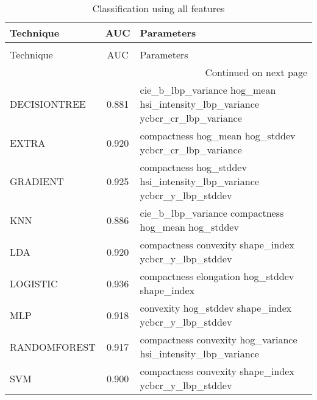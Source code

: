 \begin{longtable}{lcl}
\caption[Classification using all features]{Classification using all features}
\label{table:optimal}\\
\toprule
Technique &   AUC &                                                                   Parameters \\
\midrule
\endfirsthead
\caption[]{Classification using all features} \\
\toprule
Technique &   AUC &                                                                   Parameters \\
\midrule
\endhead
\midrule
\multicolumn{3}{r}{{Continued on next page}} \\
\midrule
\endfoot

\bottomrule
\endlastfoot
DECISIONTREE & 0.881 &  cie\_b\_lbp\_variance hog\_mean hsi\_intensity\_lbp\_variance ycbcr\_cr\_lbp\_variance \\
       EXTRA & 0.920 &                        compactness hog\_mean hog\_stddev ycbcr\_cr\_lbp\_variance \\
    GRADIENT & 0.925 &         compactness hog\_stddev hsi\_intensity\_lbp\_variance ycbcr\_y\_lbp\_stddev \\
         KNN & 0.886 &                           cie\_b\_lbp\_variance compactness hog\_mean hog\_stddev \\
         LDA & 0.920 &                          compactness convexity shape\_index ycbcr\_y\_lbp\_stddev \\
    LOGISTIC & 0.936 &                                compactness elongation hog\_stddev shape\_index \\
         MLP & 0.918 &                         convexity hog\_stddev shape\_index ycbcr\_y\_lbp\_stddev \\
RANDOMFOREST & 0.917 &                compactness convexity hog\_variance hsi\_intensity\_lbp\_variance \\
         SVM & 0.900 &                        compactness convexity shape\_index ycbcr\_y\_lbp\_stddev \\
\end{longtable}
